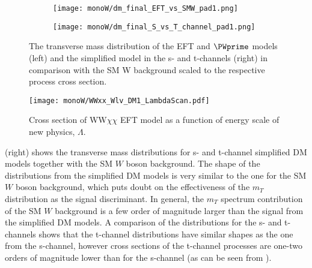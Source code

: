 \begin{figure}[]
\begin{subfigure}{.5\textwidth}
  \centering
  \texttt{[image: monoW/dm\_final\_EFT\_vs\_SMW\_pad1.png]}
\end{subfigure}%
\begin{subfigure}{.5\textwidth}
  \centering
  \texttt{[image: monoW/dm\_final\_S\_vs\_T\_channel\_pad1.png]} 
\end{subfigure}
\caption{The transverse mass distribution
of the EFT and $\PWprime$ models (left) and the simplified model in the s- and t-channels (right) in comparison with the SM W background scaled to the respective process cross section.}
  \label{fig:scaledKin}
\end{figure}

\begin{figure}[]
 \texttt{[image: monoW/WWxx\_Wlv\_DM1\_LambdaScan.pdf]}
  \caption{Cross section of WW$\chi\chi$ EFT model as a function of energy scale of new physics, $\Lambda$.}
  \label{fig:lambdaScan}
\end{figure}

 (right) shows the transverse mass distributions for s- and t-channel simplified DM models together with the SM $W$ boson background.
The shape of the distributions from the simplified DM models is very similar to the one for the SM $W$ boson background, which puts doubt on the effectiveness of the $m_T$ distribution as the signal discriminant. In general, the $m_T$ spectrum contribution of the SM $W$ background is
a few order of magnitude larger than the signal from the simplified DM models.
A comparison of the distributions for the s- and t-channels shows that the t-channel distributions
have similar shapes as the one from the s-channel, however cross sections of the t-channel 
processes are one-two orders of magnitude lower than for the s-channel (as can be seen from ).






